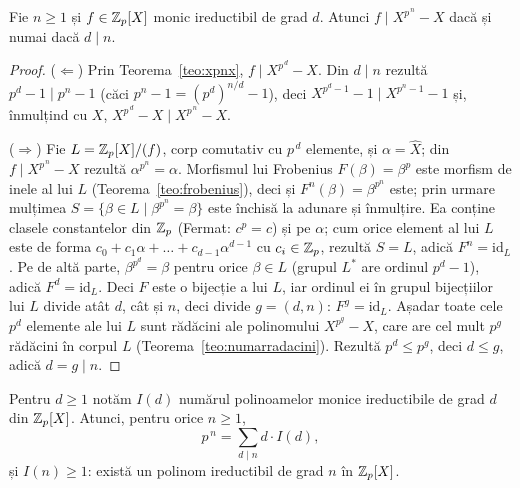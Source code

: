 \begin{lema}\label{lema:ireddivide}
Fie $n\ge1$ și $f\in\mathbb{Z}_p[X]$ monic ireductibil de grad $d$. Atunci $f\mid X^{p^{\,n}}-X$ dacă și numai dacă $d\mid n$.
\end{lema}

\begin{proof}
($\Leftarrow$) Prin Teorema~\ref{teo:xpnx}, $f\mid X^{p^{\,d}}-X$. Din $d\mid n$ rezultă $p^d-1\mid p^n-1$ (căci $p^n-1=(p^d)^{n/d}-1$), deci $X^{p^d-1}-1\mid X^{p^n-1}-1$ și, înmulțind cu $X$, $X^{p^{\,d}}-X\mid X^{p^{\,n}}-X$.

($\Rightarrow$) Fie $L=\mathbb{Z}_p[X]/(f)$, corp comutativ cu $p^{\,d}$ elemente, și $\alpha=\widehat X$; din $f\mid X^{p^{\,n}}-X$ rezultă $\alpha^{p^n}=\alpha$. Morfismul lui Frobenius $F(\beta)=\beta^p$ este morfism de inele al lui $L$ (Teorema~\ref{teo:frobenius}), deci și $F^n(\beta)=\beta^{p^n}$ este; prin urmare mulțimea $S=\{\beta\in L\mid\beta^{p^n}=\beta\}$ este închisă la adunare și înmulțire. Ea conține clasele constantelor din $\mathbb{Z}_p$ (Fermat: $c^p=c$) și pe $\alpha$; cum orice element al lui $L$ este de forma $c_0+c_1\alpha+\dots+c_{d-1}\alpha^{d-1}$ cu $c_i\in\mathbb{Z}_p$, rezultă $S=L$, adică $F^n=\mathrm{id}_L$. Pe de altă parte, $\beta^{p^d}=\beta$ pentru orice $\beta\in L$ (grupul $L^*$ are ordinul $p^d-1$), adică $F^d=\mathrm{id}_L$. Deci $F$ este o bijecție a lui $L$, iar ordinul ei în grupul bijecțiilor lui $L$ divide atât $d$, cât și $n$, deci divide $g=(d,n)$: $F^g=\mathrm{id}_L$. Așadar toate cele $p^d$ elemente ale lui $L$ sunt rădăcini ale polinomului $X^{p^g}-X$, care are cel mult $p^g$ rădăcini în corpul $L$ (Teorema~\ref{teo:numarradacini}). Rezultă $p^d\le p^g$, deci $d\le g$, adică $d=g\mid n$.
\end{proof}

\begin{teorema}\label{teo:existaired}
Pentru $d\ge1$ notăm $I(d)$ numărul polinoamelor monice ireductibile de grad $d$ din $\mathbb{Z}_p[X]$. Atunci, pentru orice $n\ge1$,
\[
p^{\,n}=\sum_{d\mid n}d\cdot I(d),
\]
și $I(n)\ge1$: există un polinom ireductibil de grad $n$ în $\mathbb{Z}_p[X]$.
\end{teorema}

